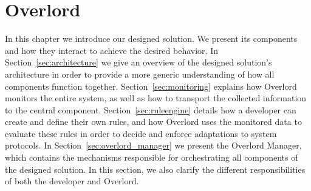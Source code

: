 
%


\epigraphfontsize{\small\itshape}
\setlength\epigraphwidth{12.5cm}
\setlength\epigraphrule{0pt}
%
%
%
\chapter{Overlord}
\label{cha:overlord}

In this chapter we introduce our designed solution. We present its components and how they interact to achieve the desired behavior. In Section~\ref{sec:architecture} we give an overview of the designed solution's architecture in order to provide a more generic understanding of how all components function together. Section~\ref{sec:monitoring} explains how Overlord monitors the entire system, as well as how to transport the collected information to the central component. Section~\ref{sec:ruleengine} details how a developer can create and define their own rules, and how Overlord uses the monitored data to evaluate these rules in order to decide and enforce adaptations to system protocols. In Section~\ref{sec:overlord_manager} we present the Overlord Manager, which contains the mechanisms responsible for orchestrating all components of the designed solution. In this section, we also clarify the different responsibilities of both the developer and Overlord.

%

